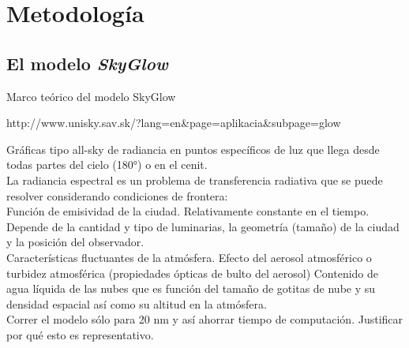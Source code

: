 \chapter{Metodología}

\section{El modelo \textit{SkyGlow}}

Marco teórico del modelo SkyGlow

http://www.unisky.sav.sk/?lang=en&page=aplikacia&subpage=glow

Gráficas tipo all-sky de radiancia en puntos específicos de luz que llega desde todas partes del cielo (180°) o en el cenit.\\

La radiancia espectral es un problema de transferencia radiativa que se puede resolver considerando condiciones de frontera:\\

Función de emisividad de la ciudad. Relativamente constante en el tiempo. Depende de la cantidad y tipo de luminarias, la geometría (tamaño) de la ciudad y la posición del observador.\\

Características fluctuantes de la atmósfera. 
Efecto del aerosol atmosférico o turbidez atmosférica (propiedades ópticas de bulto del aerosol)
Contenido de agua líquida de las nubes que es función del tamaño de gotitas de nube y su densidad espacial así como su altitud en la atmósfera.\\

Correr el modelo sólo para 20 nm y así ahorrar tiempo de computación. Justificar por qué esto es representativo.